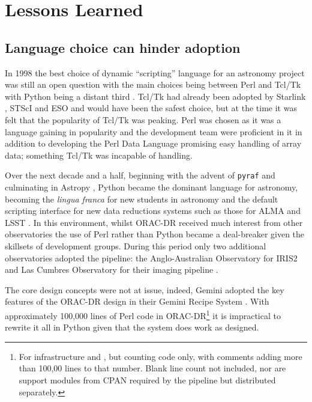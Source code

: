 \documentclass[final,authoryear,5p,times,twocolumn]{elsarticle}
\begin{document}
\section{Lessons Learned}

\subsection{Language choice can hinder adoption}

In 1998 the best choice of dynamic ``scripting'' language for an astronomy project was
still an open question with the main choices being between Perl and
Tcl/Tk with Python being a distant third
\citep{1999ASPC..172..494J,1999ASPC..172..483B,2000ASPC..216...91J}.
Tcl/Tk had already been adopted by Starlink
\citep{1995ASPC...77..395T}, STScI \citep{1998SPIE.3349...89D} and ESO \citep{1996ASPC..101..396H,1995ASPC...77...58C} and
would have been the safest choice, but at the time it was felt that
the popularity of Tcl/Tk was peaking. Perl was chosen as it was a language
gaining in popularity and the development team were proficient in
it in addition to developing the Perl Data Language \citep[PDL;][]{PDL}
promising easy handling of array data; something Tcl/Tk was incapable
of handling.

Over the next decade and a half, beginning with the advent of \texttt{pyraf}
\citep[][]{2000ASPC..216...59G,2006hstc.conf..437G}
and culminating in Astropy \citep{2013A&A...558A..33A},
Python became the dominant language for astronomy,
becoming the \emph{lingua franca} for new students in astronomy and
the default scripting interface for new data reductions systems such
as those for ALMA
\citep{2007ASPC..376..127M} and LSST \citep{2010SPIE.7740E..15A}.
In this environment, whilst ORAC-DR received much interest from other
observatories the use of Perl rather than Python became a
deal-breaker given the skillsets of development groups. During this
period only two additional observatories adopted the pipeline: the
Anglo-Australian Observatory for IRIS2 \citep{2004SPIE.5492..998T} and Las Cumbres
Observatory for their imaging pipeline \citep{2013PASP..125.1031B}.

The core design concepts were not at issue, indeed, Gemini adopted the
key features of the ORAC-DR design in their Gemini Recipe System
\citep{2014ASPC..485..359L}. With approximately 100,000 lines of Perl code in
ORAC-DR\footnote{For infrastructure and \primitives, but counting code only, with comments adding more than
  100,00 lines to that
  number. Blank line count not included, nor are support modules from CPAN
  required by the pipeline but distributed separately.} it
is impractical to rewrite it all in Python given that the system does
work as designed.
\end{document}
